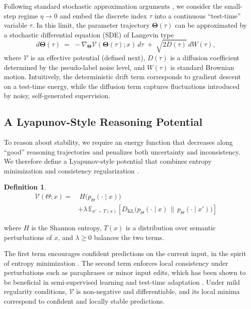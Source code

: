 \documentclass{article}
\theoremstyle{plain}
\theoremstyle{definition}
\newtheorem{definition}[theorem]{Definition}
\theoremstyle{remark}
\newcommand{\ThetaState}{\mathbf{\Theta}}  %
\newcommand{\Lyap}{\mathcal{V}}            %
\newcommand{\Time}{\tau}                   %
\begin{document}
Following standard stochastic approximation arguments \cite{borkar2000ode,oksendal2003stochastic,welling2011bayesian}, we consider the small-step regime $\eta \to 0$ and embed the discrete index $\tau$ into a continuous ``test-time'' variable $\Time$. In this limit, the parameter trajectory $\ThetaState(\Time)$ can be approximated by a stochastic differential equation (SDE) of Langevin type
\begin{equation}
    d\ThetaState(\Time)
    \;=\;
    - \nabla_{\ThetaState} \Lyap(\ThetaState(\Time); x)\, d\Time
    \;+\;
    \sqrt{2 D(\Time)} \, dW(\Time),
    \label{eq:sde}
\end{equation}
where $\Lyap$ is an effective potential (defined next), $D(\Time)$ is a diffusion coefficient determined by the pseudo-label noise level, and $W(\Time)$ is standard Brownian motion. Intuitively, the deterministic drift term corresponds to gradient descent on a test-time energy, while the diffusion term captures fluctuations introduced by noisy, self-generated supervision.

\subsection{A Lyapunov-Style Reasoning Potential}

To reason about stability, we require an energy function that decreases along ``good'' reasoning trajectories and penalizes both uncertainty and inconsistency. We therefore define a Lyapunov-style potential that combines entropy minimization and consistency regularization \cite{grandvalet2005entropy,sohn2020fixmatch,zhai2019s4l}.

\begin{definition}
\label{def:potential}
\begin{equation}
\begin{aligned}
\Lyap(\Theta; x) = &\ H\bigl(p_\Theta(\cdot \mid x)\bigr) \\
& + \lambda \, \mathbb{E}_{x' \sim T(x)} \left[ D_{\mathrm{KL}}\bigl(p_\Theta(\cdot \mid x) \,\big\|\, p_\Theta(\cdot \mid x')\bigr) \right]
\end{aligned}
\end{equation}

where $H$ is the Shannon entropy, $T(x)$ is a distribution over semantic perturbations of $x$, and $\lambda \ge 0$ balances the two terms.
\end{definition}

The first term encourages confident predictions on the current input, in the spirit of entropy minimization \cite{grandvalet2005entropy,wang2021tent}. The second term enforces local consistency under perturbations such as paraphrases or minor input edits, which has been shown to be beneficial in semi-supervised learning and test-time adaptation \cite{sohn2020fixmatch,zhai2019s4l,zhang2024surveytta}. Under mild regularity conditions, $\Lyap$ is non-negative and differentiable, and its local minima correspond to confident and locally stable predictions.
\end{document}
